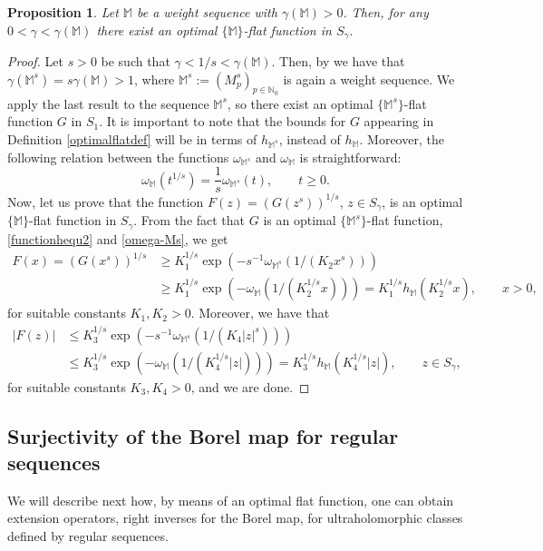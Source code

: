 \documentclass[11pt,a4paper]{article}
\theoremstyle{plain}
\newtheorem{prop}[theo]{Proposition}
\theoremstyle{definition}
\newcommand{\N}{\mathbb{N}}
\newcommand{\M}{\mathbb{M}}
\def\ga{\gamma}
\begin{document}
\begin{prop}\label{prop.ExistOptFlatFunct}
Let $\M$ be a weight sequence with $\ga(\M)>0$. Then, for any $0<\gamma<\ga(\M)$ there exist an optimal $\{\M\}$-flat function in $S_\ga$.
\end{prop}
\begin{proof}
	Let $s>0$ be such that $\ga<1/s<\ga(\M)$. Then, by \cite[Th.\ 3.10, Prop.\ 3.6]{JimenezSanzSchindlIndex} we have that $\ga({\M}^s)=s\ga(\M)>1$, where ${\M}^s:=(M_p^s)_{p\in\N_0}$ is again a weight sequence. We apply the last result to the sequence ${\M}^s$, so there exist an optimal $\{\M^s\}$-flat function $G$ in $S_1$. It is important to note that the bounds for $G$ appearing in Definition \ref{optimalflatdef} will be in terms of $h_{{\M}^{s}}$, instead of $h_{\M}$. Moreover, the following relation between the functions $\omega_{\M^s}$ and $\omega_{\M}$ is straightforward:
	\begin{equation}\label{omega-Ms}
		\omega_{\M}(t^{1/s})=\frac{1}{s}\omega_{\M^s}(t),\qquad t\geq 0.
	\end{equation}
	Now, let us prove that the function $F(z)=(G(z^s))^{1/s}$, $z\in S_\ga$, is an optimal $\{\M\}$-flat function in $S_\ga$.
	From the fact that $G$ is an optimal $\{\M^s\}$-flat function, \eqref{functionhequ2} and \eqref{omega-Ms}, we get
		\begin{align*}
				F(x)=(G(x^s))^{1/s}&\geq K_1^{1/s}\exp(-s^{-1}\omega_{\M^s}(1/(K_2 x^s)))\\
				&\geq K_1^{1/s}\exp(-\omega_{\M}(1/(K_2^{1/s} x)))=K_1^{1/s}h_{\M}(K_2^{1/s} x), \qquad x>0,
		\end{align*}
	for suitable constants $K_1,K_2>0$. Moreover, we have that
		\begin{align*}
				|F(z)|&\leq K_3^{1/s}\exp(-s^{-1}\omega_{\M^s}(1/(K_4 |z|^s)))\\
				&\leq K_3^{1/s}\exp(-\omega_{\M}(1/(K_4^{1/s} |z|)))=K_3^{1/s}h_{\M}(K_4^{1/s} |z|),\qquad z\in S_\ga,
		\end{align*}
	for suitable constants $K_3,K_4>0$, and we are done.
\end{proof}



\subsection{Surjectivity of the Borel map for regular sequences}

We will describe next how, by means of an optimal flat function, one can obtain extension operators, right inverses for the Borel map, for ultraholomorphic classes defined by regular sequences.
\end{document}
